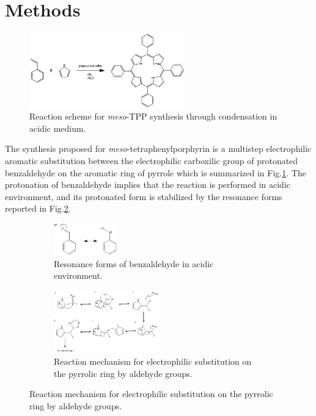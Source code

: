 \documentclass[num-refs]{wiley-article}
\begin{document}
\section{Methods}
\begin{figure}[t!]
        \centering
        \includegraphics[width=0.6\textwidth]{reaction}
        \caption{Reaction scheme for \textit{meso}-TPP synthesis through condensation in acidic medium.}
        \label{reaction}
\end{figure}
The synthesis proposed for \textit{meso}-tetraphenylporphyrin is a multistep electrophilic aromatic substitution between the electrophilic carboxilic group of protonated benzaldehyde on the aromatic ring of pyrrole which is summarized in Fig.\ref{reaction}.
The protonation of benzaldehyde implies that the reaction is performed in acidic environment, and its protonated form is stabilized by the resonance forms reported in Fig.\ref{res-benz}.\\
\begin{figure}[b!]
    \centering
    \begin{subfigure}
        \centering
        \includegraphics[width=0.3\textwidth]{resonance-benzaldehyde}
        \caption{Resonance forms of benzaldehyde in acidic environment.}
        \label{res-benz}
    \end{subfigure}
    \begin{subfigure}
        \centering
        \includegraphics[width=0.5\textwidth]{mechanism}
        \caption{Reaction mechanism for electrophilic substitution on the pyrrolic ring by aldehyde groups.}
        \label{mechanism}
    \end{subfigure}
\end{figure}
\end{document}
